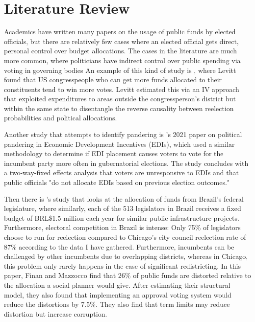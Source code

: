 \section*{Literature Review}
Academics have written many papers on the usage of public funds by elected officials, but there are relatively few cases where an elected official gets direct, personal control over budget allocations. 
The cases in the literature are much more common, where politicians have indirect control over public spending via voting in governing bodies
An example of this kind of study is \cite{levitt1997impact}, where Levitt found that US congresspeople who can get more funds allocated to their constituents tend to win more votes. 
Levitt estimated this via an IV approach that exploited expenditures to areas outside the congressperson's district but within the same state to disentangle the reverse causality between reelection probabilities and political allocations. 

Another study that attempts to identify pandering is \cite{BundrickPandering}'s 2021 paper on political pandering in Economic Development Incentives (EDIs), which used a similar methodology to determine if EDI placement causes voters to vote for the incumbent party more often in gubernatorial elections. 
The study concludes with a two-way-fixed effects analysis that voters are unresponsive to EDIs and that public officials "do not allocate EDIs based on previous election outcomes." 

Then there is \cite{finan2021electoral}'s study that looks at the allocation of funds from Brazil's federal legislature, where similarly, each of the 513 legislators in Brazil receives a fixed budget of BRL\$1.5 million each year for similar public infrastructure projects.  
Furthermore, electoral competition in Brazil is intense: Only 75\% of legislators choose to run for reelection compared to Chicago's city council reelection rate of 87\% according to the data I have gathered. 
Furthermore, incumbents can be challenged by other incumbents due to overlapping districts, whereas in Chicago, this problem only rarely happens in the case of significant redistricting. 
In this paper, Finan and Mazzocco find that 26\% of public funds are distorted relative to the allocation a social planner would give. 
After estimating their structural model, they also found that implementing an approval voting system would reduce the distortions by 7.5\%. 
They also find that term limits may reduce distortion but increase corruption.

